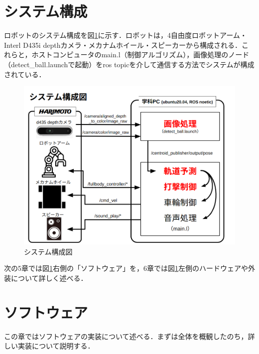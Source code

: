 \documentclass[10pt, oneside, titlepage]{ltjarticle}  %
\begin{document}
\section{システム構成}
ロボットのシステム構成を図\ref{system}に示す．ロボットは，4自由度ロボットアーム・Interl D435i depthカメラ・メカナムホイール・スピーカーから構成される．これらと，ホストコンピュータのmain.l（制御アルゴリズム），画像処理のノード（detect\_ball.launchで起動）をros topicを介して通信する方法でシステムが構成されている．
\begin{figure}[H]
  \centering
  \includegraphics[width=12cm]{figures/system.png}
  \caption{システム構成図}
  \label{system}
\end{figure}
次の5章では図\ref{system}右側の「ソフトウェア」を，6章では図\ref{system}左側のハードウェアや外装について詳しく述べる．

\section{ソフトウェア}
この章ではソフトウェアの実装について述べる．まずは全体を概観したのち，詳しい実装について説明する．
\end{document}
